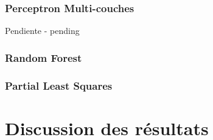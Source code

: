 \subsection{Perceptron Multi-couches}
Pendiente - pending


\subsection{Random Forest}






\subsection{Partial Least Squares}



\chapter{Discussion des résultats}



